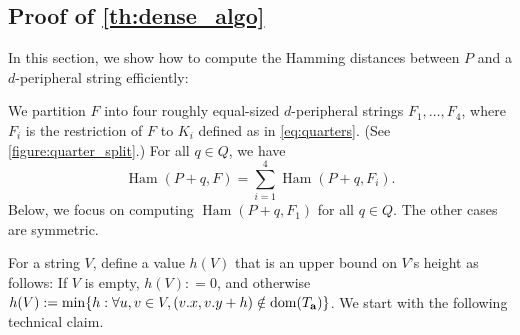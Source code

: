 \documentclass[11pt, letterpaper]{article}
\theoremstyle{plain}
\theoremstyle{definition}
\theoremstyle{remark}
\DeclareMathOperator*{\Ham}{Ham}
\begin{document}
\subsection{Proof of \cref{th:dense_algo}}
In this section, we show how to compute the Hamming distances between $P$ and a $d$-peripheral string efficiently:

\DenseAlgo

We partition $F$ into four roughly equal-sized $d$-peripheral strings $F_1, \dots, F_4$, where $F_i$ is the restriction of $F$ to $K_i$ defined as in \cref{eq:quarters}. (See \cref{figure:quarter_split}.) For all $q \in Q$, we have 
%
$$\Ham(P + q, F) = \sum_{i = 1}^4 \Ham(P + q, F_i).$$
%
Below, we focus on computing $\Ham(P + q, F_1)$ for all $q \in Q$. The other cases are symmetric. 

For a string $V$, define a value $h(V)$ that is an upper bound on $V$'s height as follows: If $V$ is empty, $h(V): = 0$, and otherwise $h(V) := \min \{h : \forall u,v \in V, (v.x, v.y + h) \notin \operatorname*{dom}(T_\mathbf{a})\}$. We start with the following technical claim.
\end{document}
